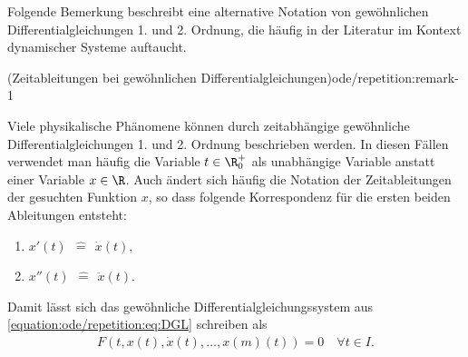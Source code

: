 \documentclass[letterpaper,10pt,german]{jupyterBook}
\begin{document}
\par
Folgende Bemerkung beschreibt eine alternative Notation von gewöhnlichen Differentialgleichungen 1. und 2. Ordnung, die häufig in der Literatur im Kontext dynamischer Systeme auftaucht.
\begin{remark}{(Zeitableitungen bei gewöhnlichen Differentialgleichungen)}{ode/repetition:remark-1}



\par
Viele physikalische Phänomene können durch zeitabhängige gewöhnliche Differentialgleichungen 1. und 2. Ordnung beschrieben werden.
In diesen Fällen verwendet man häufig die Variable \(t \in \R^+_0\) als unabhängige Variable anstatt einer Variable \(x \in \R\).
Auch ändert sich häufig die Notation der Zeitableitungen der gesuchten Funktion \(x\), so dass folgende Korrespondenz für die ersten beiden Ableitungen entsteht:
\begin{enumerate}

\item {} 
\par
\(x'(t) \ \ \hat{=} \ \ \dot{x}(t)\),

\item {} 
\par
\(x''(t) \ \ \hat{=} \ \ \ddot{x}(t)\).

\end{enumerate}

\par
Damit lässt sich das gewöhnliche Differentialgleichungssystem aus \eqref{equation:ode/repetition:eq:DGL} schreiben als
\begin{align}\label{equation:ode/repetition:eq:DGLtime}
F(t, x(t), \dot{x}(t), \ldots, x{(m)}(t)) = 0 \quad \forall t\in I.
\end{align}\end{remark}
\end{document}
